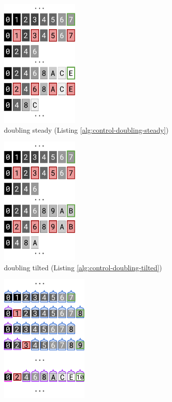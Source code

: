 \begin{figure}
\begin{subfigure}{0.25\linewidth}
\centering
\includegraphics[height=2.5in]{img/surface-control-naive-steady}
\caption{doubling steady (Listing \ref{alg:control-doubling-steady})}
\label{fig:surface-control:naive-steady}
\end{subfigure}%
\begin{subfigure}{0.25\linewidth}
\centering
\includegraphics[height=2.5in]{img/surface-control-naive-tilted}
\caption{doubling tilted (Listing \ref{alg:control-doubling-tilted})}
\label{fig:surface-control:naive-tilted}
\end{subfigure}%
\begin{subfigure}{0.25\linewidth}
\centering
\includegraphics[height=2.5in]{img/surface-control-zhao-steady}

\end{subfigure}
\end{figure}
